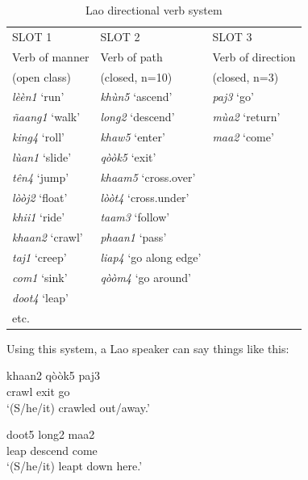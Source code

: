 \begin{table}[htbp]
      \begin{tabular}{lll}
  
    SLOT 1 & SLOT 2 & SLOT 3 \\

    Verb of manner & Verb of path & Verb of direction \\
    (open class) & (closed, n=10) & (closed, n=3) \\
    \textit{lèèn1} ‘run’ & \textit{khùn5} ‘ascend’ & \textit{paj3} ‘go’ \\
    \textit{ñaang1} ‘walk’ & \textit{long2} ‘descend’ & \textit{mùa2} ‘return’ \\
    \textit{king4} ‘roll’ & \textit{khaw5} ‘enter’ & \textit{maa2} ‘come’ \\
    \textit{lùan1} ‘slide’ & \textit{qòòk5} ‘exit’ &  \\
    \textit{tên4} ‘jump’ & \textit{khaam5} ‘cross.over’ &  \\
    \textit{lòòj2} ‘float’ & \textit{lòòt4} ‘cross.under’ &  \\
    \textit{khii1} ‘ride’ & \textit{taam3} ‘follow’ &  \\
    \textit{khaan2} ‘crawl’ & \textit{phaan1} ‘pass’ &  \\
    \textit{taj1} ‘creep’ & \textit{liap4} ‘go along edge’ &  \\
    \textit{com1} ‘sink’ & \textit{qòòm4} ‘go around’ &  \\
    \textit{doot4} ‘leap’ &       &  \\
    etc.  &       &  \\
   
    \end{tabular}%
    
\caption{Lao directional verb system}  
\label{laodirectionalverbsystem}%
\end{table}%




Using this system, a Lao speaker can say things like this:


\ea
\gll khaan2 qòòk5 paj3 \\
     crawl  exit  go \\
\glt \textquoteleft (S/he/it) crawled out/away.'
\z

\ea
\gll doot5 long2 maa2 \\
     leap descend come \\
\glt \textquoteleft (S/he/it) leapt down here.'
\z

